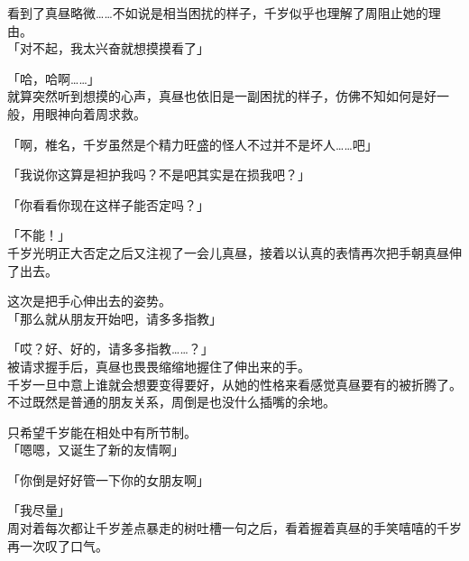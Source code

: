 看到了真昼略微……不如说是相当困扰的样子，千岁似乎也理解了周阻止她的理由。\\

「对不起，我太兴奋就想摸摸看了」

「哈，哈啊……」\\

就算突然听到想摸的心声，真昼也依旧是一副困扰的样子，仿佛不知如何是好一般，用眼神向着周求救。

「啊，椎名，千岁虽然是个精力旺盛的怪人不过并不是坏人……吧」

「我说你这算是袒护我吗？不是吧其实是在损我吧？」

「你看看你现在这样子能否定吗？」

「不能！」\\

千岁光明正大否定之后又注视了一会儿真昼，接着以认真的表情再次把手朝真昼伸了出去。

这次是把手心伸出去的姿势。\\

「那么就从朋友开始吧，请多多指教」

「哎？好、好的，请多多指教……？」\\

被请求握手后，真昼也畏畏缩缩地握住了伸出来的手。\\

千岁一旦中意上谁就会想要变得要好，从她的性格来看感觉真昼要有的被折腾了。不过既然是普通的朋友关系，周倒是也没什么插嘴的余地。

只希望千岁能在相处中有所节制。\\

「嗯嗯，又诞生了新的友情啊」

「你倒是好好管一下你的女朋友啊」

「我尽量」\\

周对着每次都让千岁差点暴走的树吐槽一句之后，看着握着真昼的手笑嘻嘻的千岁再一次叹了口气。\\
